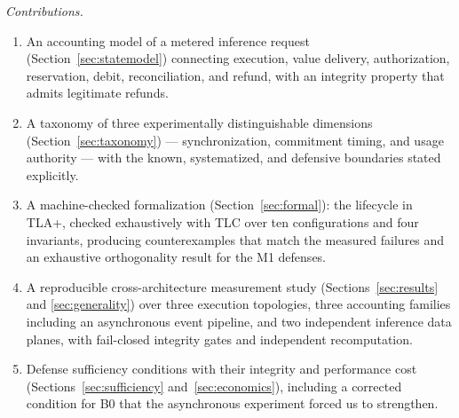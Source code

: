 \documentclass[preprint,3p,authoryear,12pt]{elsarticle}
\begin{document}
\textit{Contributions.}
\begin{enumerate}
\item An accounting model of a metered inference request (Section~\ref{sec:statemodel})
connecting execution, value delivery, authorization, reservation, debit, reconciliation,
and refund, with an integrity property that admits legitimate refunds.
\item A taxonomy of three experimentally distinguishable dimensions
(Section~\ref{sec:taxonomy}) --- synchronization, commitment timing, and usage authority
--- with the known, systematized, and defensive boundaries stated explicitly.
\item A machine-checked formalization (Section~\ref{sec:formal}): the lifecycle in TLA+,
checked exhaustively with TLC over ten configurations and four invariants, producing
counterexamples that match the measured failures and an exhaustive orthogonality result
for the M1 defenses.
\item A reproducible cross-architecture measurement study (Sections~\ref{sec:results} and
\ref{sec:generality}) over three execution topologies, three accounting families
including an asynchronous event pipeline, and two independent inference data planes,
with fail-closed integrity gates and independent recomputation.
\item Defense sufficiency conditions with their integrity and performance cost
(Sections~\ref{sec:sufficiency} and~\ref{sec:economics}), including a corrected condition
for B0 that the asynchronous experiment forced us to strengthen.
\end{enumerate}

\begin{table}[t]
\caption{Adversary directions in LLM inference accounting. Prior work covers the first
three rows; this paper studies the fourth.}
\label{tab:quadrant}
\centering
{}
\end{table}
\end{document}
